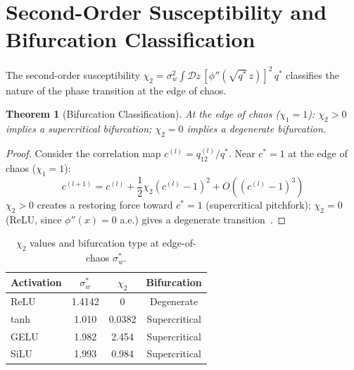 \documentclass[10pt]{article}
\newtheorem{theorem}{Theorem}
\begin{document}
\section{Second-Order Susceptibility and Bifurcation Classification}
\label{app:chi2-proof}

The second-order susceptibility $\chi_2 = \sigma_w^2 \int \mathcal{D}z\, [\phi''(\sqrt{q^*}\, z)]^2\, q^*$ classifies the nature of the phase transition at the edge of chaos.

\begin{theorem}[Bifurcation Classification]
\label{thm:bifurcation}
At the edge of chaos ($\chi_1 = 1$): $\chi_2 > 0$ implies a supercritical bifurcation; $\chi_2 = 0$ implies a degenerate bifurcation.
\end{theorem}

\begin{proof}
Consider the correlation map $c^{(l)} = q_{12}^{(l)}/q^*$.
Near $c^* = 1$ at the edge of chaos ($\chi_1 = 1$):
\begin{equation}
    c^{(l+1)} = c^{(l)} + \frac{1}{2}\chi_2 (c^{(l)} - 1)^2 + O((c^{(l)} - 1)^3)
\end{equation}
$\chi_2 > 0$ creates a restoring force toward $c^* = 1$ (supercritical pitchfork); $\chi_2 = 0$ (ReLU, since $\phi''(x) = 0$ a.e.) gives a degenerate transition~\cite{diBernardo2008piecewise}.
\end{proof}

\begin{table}[h]
\centering
\caption{$\chi_2$ values and bifurcation type at edge-of-chaos $\sigma_w^*$.}
\label{tab:chi2}
\small
\begin{tabular}{@{}lccc@{}}
\toprule
\textbf{Activation} & $\sigma_w^*$ & $\chi_2$ & \textbf{Bifurcation} \\
\midrule
ReLU  & 1.4142 & 0        & Degenerate \\
tanh  & 1.010  & 0.0382   & Supercritical \\
GELU  & 1.982  & 2.454    & Supercritical \\
SiLU  & 1.993  & 0.984    & Supercritical \\
\bottomrule
\end{tabular}
\end{table}

\end{document}
